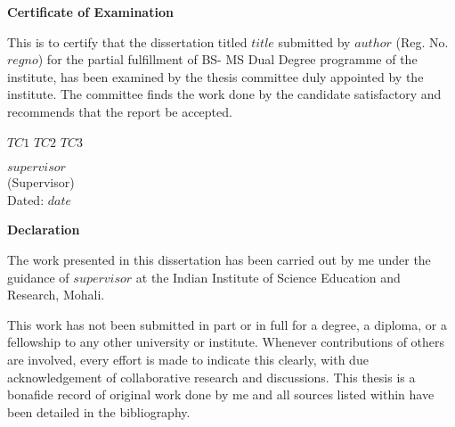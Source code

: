 
\maketitle
{}


\begin{center}
    \textbf{\Large Certificate of Examination}
\end{center}

This is to certify that the dissertation titled \textbf{$title$} submitted by \textbf{$author$} (Reg. No. $regno$) for the partial fulfillment of BS- MS Dual Degree programme of the institute, has been examined by the thesis committee duly appointed by the institute. The committee finds the work done by the candidate satisfactory and recommends that the report be accepted.

\vspace{3cm}

\begin{center}
    {\small $TC1$ \hspace{1cm} $TC2$ \hspace{1cm} $TC3$}
\end{center}

\vspace{5cm}

\begin{flushright}
    $supervisor$\\
    (Supervisor)\\
    \vspace{2.4cm}
    Dated: $date$
\end{flushright}

\clearpage
\begingroup
    \null
    \thispagestyle{empty}%
    \hypersetup{pageanchor=false}%
    \clearpage
\endgroup

\begin{center}
    \textbf{\Large Declaration}
\end{center}
The work presented in this dissertation has been carried out by me under the guidance of $supervisor$ at the Indian Institute of Science Education and Research, Mohali.

\vspace{0.4cm}

This work has not been submitted in part or in full for a degree, a diploma, or a fellowship to any other university or institute. Whenever contributions of others are involved, every effort is made to indicate this clearly, with due acknowledgement of collaborative research and discussions. This thesis is a bonafide record of original work done by me and all sources listed within have been detailed in the bibliography.

